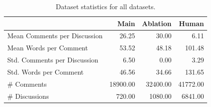 \begin{table}[ht]
\caption{Dataset statistics for all datasets.}
\label{tab:dataset-stats}
\begin{tabular}{lrrr}
\toprule
& Main & Ablation & Human \\
\midrule
Mean Comments per Discussion & 26.25 & 30.00 & 6.11 \\
Mean Words per Comment & 53.52 & 48.18 & 101.48 \\
Std. Comments per Discussion & 6.50 & 0.00 & 3.29 \\
Std. Words per Comment & 46.56 & 34.66 & 131.65 \\
\# Comments & 18900.00 & 32400.00 & 41772.00 \\
\# Discussions & 720.00 & 1080.00 & 6841.00 \\
\bottomrule
\end{tabular}
\end{table}
